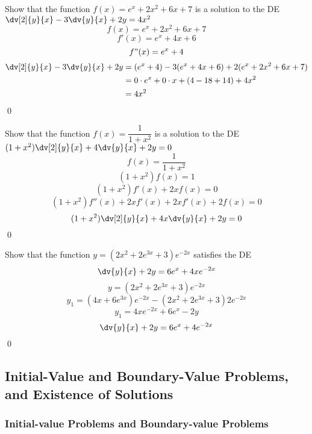 \begin{example}{
    Show that the function $f(x) = e^x+2x^2+6x+7$ is a solution to the DE $\dv[2]{y}{x} - 3\dv{y}{x} + 2y = 4x^2$ 
}{}
    \[ f(x) = e^x + 2x^2 + 6x + 7 \]
    \[ f'(x) = e^x + 4x + 6 \]
    \[ f"(x) = e^x + 4 \]
    \begin{align*}
        \dv[2]{y}{x} - 3\dv{y}{x} + 2y &= (e^x+4) - 3(e^x+4x+6) + 2(e^x+2x^2+6x+7) \\
        &= 0\cdot e^x + 0\cdot x + (4-18+14) + 4x^2 \\
        &= 4x^2
    \end{align*} \qed
\end{example}

\begin{example}{
    Show that the function $f(x) = \dfrac{1}{1+x^2}$ is a solution to the DE $(1+x^2)\dv[2]{y}{x} + 4\dv{y}{x} + 2y = 0$ 
}{}
    \[ f(x) = \frac{1}{1+x^2} \]
    \[ (1+x^2)f(x) = 1 \]
    \[ (1+x^2)f'(x) + 2xf(x) = 0 \]
    \[ (1+x^2)f''(x) + 2xf'(x) + 2xf'(x) + 2f(x) = 0 \]
    \[
        (1+x^2) \dv[2]{y}{x} + 4x \dv{y}{x} + 2y = 0
    \] \qed
\end{example}

\begin{example}{
    Show that the function $y = (2x^2+2e^{3x}+3)e^{-2x}$ satisfies the DE \[
        \dv{y}{x} + 2y = 6e^x + 4xe^{-2x}
\]}{}
    \[ y = ( 2x^2 + 2e^{3x} + 3 ) e^{-2x} \]
    \[ y_1 = ( 4x + 6e^{3x} )e^{-2x} - ( 2x^2 + 2e^{3x} + 3 )2e^{-2x} \]
    \[ y_1 = 4xe^{-2x} + 6e^x - 2y \]
    \[
        \dv{y}{x} + 2y = 6e^x + 4e^{-2x}
    \] \qed
\end{example}




\subsection{Initial-Value and Boundary-Value Problems, and Existence of Solutions}


\subsubsection{Initial-value Problems and Boundary-value Problems}

